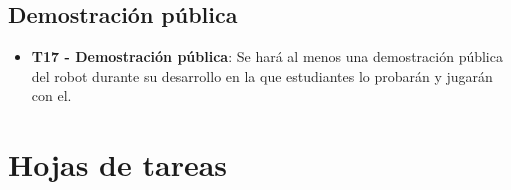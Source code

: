 \subsection{Demostración pública}

\begin{itemize}
\item \textbf{T17 - Demostración pública}: Se hará al menos una demostración pública del robot
durante su desarrollo en la que estudiantes lo probarán y jugarán con el.
\end{itemize}

\section{Hojas de tareas}


















